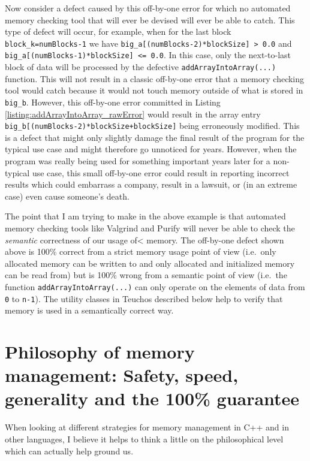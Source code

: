 \documentclass[pdf,ps2pdf,11pt]{SANDreport}
\begin{document}
Now consider a defect caused by this off-by-one error for which no
automated memory checking tool that will ever be devised will ever be
able to catch.  This type of defect will occur, for example, when for
the last block {}\texttt{block\_k=numBlocks-1} we have
{}\texttt{big\_a[(numBlocks-2)*blockSize] > 0.0} and
{}\texttt{big\_a[(numBlocks-1)*blockSize] <= 0.0}.  In this case, only
the next-to-last block of data will be processed by the defective
{}\texttt{addArrayIntoArray(...)} function.  This will not result in a
classic off-by-one error that a memory checking tool would catch
because it would not touch memory outside of what is stored in
{}\texttt{big\_b}.  However, this off-by-one error committed in Listing
{}\ref{listing:addArrayIntoArray_rawError} would result in the array
entry {}\texttt{big\_b[(numBlocks-2)*blockSize+blockSize]} being
erroneously modified.  This is a defect that might only slightly
damage the final result of the program for the typical use case and
might therefore go unnoticed for years.  However, when the program was
really being used for something important years later for a
non-typical use case, this small off-by-one error could result in
reporting incorrect results which could embarrass a company, result in
a lawsuit, or (in an extreme case) even cause someone's death.

The point that I am trying to make in the above example is that
automated memory checking tools like Valgrind and Purify will never be
able to check the {}\textit{semantic} correctness of our usage of<
memory.  The off-by-one defect shown above is 100\% correct from a
strict memory usage point of view (i.e.\ only allocated memory can be
written to and only allocated and initialized memory can be read from)
but is 100\% wrong from a semantic point of view (i.e.\ the function
{}\texttt{addArrayIntoArray(...)} can only operate on the elements of
data from {}\texttt{0} to {}\texttt{n-1}).  The utility classes in
Teuchos described below help to verify that memory is used in a
semantically correct way.


%
{}\section{Philosophy of memory management: Safety, speed, generality
and the 100\% guarantee}
\label{sec:phylosophy-of-mem-mng}
%

When looking at different strategies for memory management in C++ and
in other languages, I believe it helps to think a little on the
philosophical level which can actually help ground us.
\end{document}
